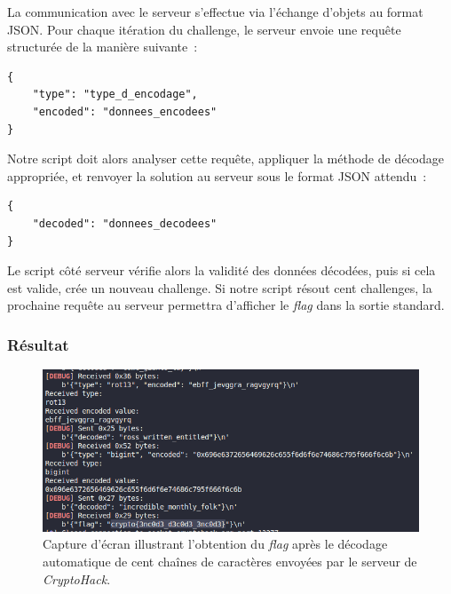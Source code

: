 La communication avec le serveur s'effectue via l'échange d'objets au
format JSON. Pour chaque itération du challenge, le serveur envoie une
requête structurée de la manière suivante~:

\begin{verbatim}
{
    "type": "type_d_encodage",
    "encoded": "donnees_encodees"
}
\end{verbatim}

Notre script doit alors analyser cette requête, appliquer la méthode de
décodage appropriée, et renvoyer la solution au serveur sous le format
JSON attendu~:

\begin{verbatim}
{
    "decoded": "donnees_decodees"
}
\end{verbatim}

Le script côté serveur vérifie alors la validité des données décodées,
puis si cela est valide, crée un nouveau challenge. Si notre script
résout cent challenges, la prochaine requête au serveur permettra
d'afficher le \textit{flag} dans la sortie standard.

\subsubsection{Résultat}

\begin{figure}[H]
    \centering
    \includegraphics[width=0.8\linewidth]{Images/Encode/encode_chall_result.png}

    \caption{Capture d'écran illustrant l'obtention du \textit{flag} après le décodage 
    automatique de cent chaînes de caractères envoyées par le serveur de \textit{CryptoHack}.}

    \label{fig:encodeChall}
\end{figure}

